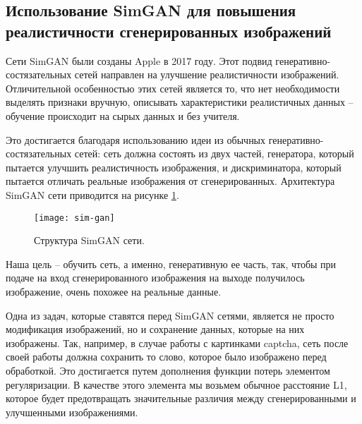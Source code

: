 \subsection{Использование SimGAN для повышения реалистичности сгенерированных изображений}
Сети SimGAN были созданы Apple в 2017 году\cite{simgan-overview}. Этот подвид генеративно-состязательных сетей направлен на улучшение реалистичности изображений. Отличительной особенностью этих сетей является то, что нет необходимости выделять признаки вручную, описывать характеристики реалистичных данных – обучение происходит на сырых данных и без учителя.

Это достигается благодаря использованию идеи из обычных генеративно-состязательных сетей: сеть должна состоять из двух частей, генератора, который пытается улучшить реалистичность изображения, и дискриминатора, который пытается отличать реальные изображения от сгенерированных. Архитектура SimGAN сети приводится на рисунке \ref{fig:sim-gan}.

\begin{figure}[h]
	\centering
	\texttt{[image: sim-gan]}
	\caption{Структура SimGAN сети.}
	\label{fig:sim-gan}
\end{figure}

Наша цель – обучить сеть, а именно, генеративную ее часть, так, чтобы при подаче на вход сгенерированного изображения на выходе получилось изображение, очень похожее на реальные данные.

Одна из задач, которые ставятся перед SimGAN сетями, является не просто модификация изображений, но и сохранение данных, которые на них изображены. Так, например, в случае работы с картинками captcha, сеть после своей работы должна сохранить то слово, которое было изображено перед обработкой. Это достигается путем дополнения функции потерь элементом регуляризации. В качестве этого элемента мы возьмем обычное расстояние L1, которое будет предотвращать значительные различия между сгенерированными и улучшенными изображениями.
